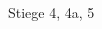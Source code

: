 \documentclass[a4paper]{article}
\begin{document}
\printGenericVSLHeader
\begin{center}
\begin{vsltext}{3cm}{3.5cm}

    \vspace{3cm}

    \Stair{2cm} Stiege 4, 4a, 5

\end{vsltext}
\end{center}
\end{document}
